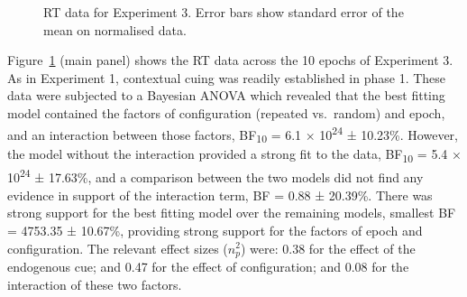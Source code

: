 \documentclass[
  man,
  floatsintext,
  longtable,
  nolmodern,
  notxfonts,
  notimes,
  colorlinks=true,linkcolor=blue,citecolor=blue,urlcolor=blue]{apa7}
\begin{document}
\begin{figure}[H]

\caption{\label{fig-RT-exp3}RT data for Experiment 3. Error bars show
standard error of the mean on normalised data.}


\end{figure}%

Figure~\ref{fig-RT-exp3} (main panel) shows the RT data across the 10
epochs of Experiment 3. As in Experiment 1, contextual cuing was readily
established in phase 1. These data were subjected to a Bayesian ANOVA
which revealed that the best fitting model contained the factors of
configuration (repeated vs.~random) and epoch, and an interaction
between those factors, BF\textsubscript{10} = 6.1 ×
10\textsuperscript{24} ± 10.23\%. However, the model without the
interaction provided a strong fit to the data, BF\textsubscript{10} =
5.4 × 10\textsuperscript{24} ± 17.63\%, and a comparison between the two
models did not find any evidence in support of the interaction term, BF
= 0.88 ± 20.39\%. There was strong support for the best fitting model
over the remaining models, smallest BF = 4753.35 ± 10.67\%, providing
strong support for the factors of epoch and configuration. The relevant
effect sizes (\(n^2_p\)) were: 0.38 for the effect of the endogenous
cue; and 0.47 for the effect of configuration; and 0.08 for the
interaction of these two factors.
\end{document}
